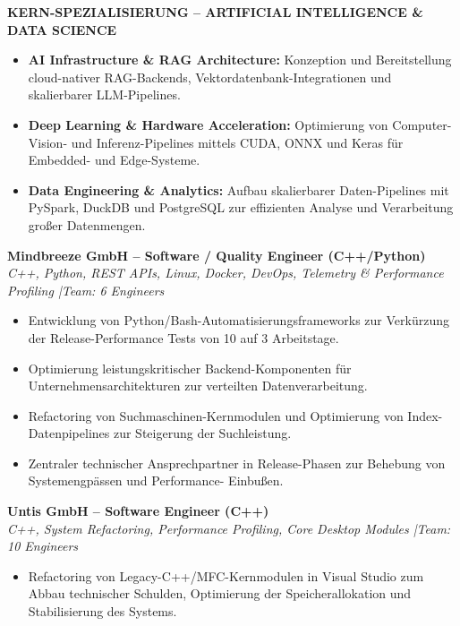 \documentclass[10pt,a4paper]{article}
\begin{document}
{\centering
\colorbox{accent!25}{%
\parbox{\dimexpr\textwidth-25\fboxsep\relax}{%
    \vspace{0.08cm}
    \centering
    {\bfseries\color{primary}KERN-SPEZIALISIERUNG -- ARTIFICIAL INTELLIGENCE \& DATA SCIENCE\par}
    \vspace{0.05cm}
    \raggedright
    \begin{itemize}[leftmargin=1.5em, itemsep=0.15em, topsep=0.15em]
        \item \textbf{\color{primary}AI Infrastructure \& RAG Architecture:} Konzeption und Bereitstellung cloud-nativer RAG-Backends, Vektordatenbank-Integrationen und skalierbarer LLM-Pipelines.
        \item \textbf{\color{primary}Deep Learning \& Hardware Acceleration:} Optimierung von Computer-Vision- und Inferenz-Pipelines mittels CUDA, ONNX und Keras für Embedded- und Edge-Systeme.
        \item \textbf{\color{primary}Data Engineering \& Analytics:} Aufbau skalierbarer Daten-Pipelines mit PySpark, DuckDB und PostgreSQL zur effizienten Analyse und Verarbeitung großer Datenmengen.
    \end{itemize}
    \vspace{0.05cm}
}%
}\par}


\textbf{Mindbreeze GmbH -- Software / Quality Engineer (C++/Python)} \\
\textit{C++, Python, REST APIs, Linux, Docker, DevOps, Telemetry \& Performance Profiling \quad|\quad Team: 6 Engineers}
\begin{itemize}
    \item Entwicklung von Python/Bash-Automatisierungsframeworks zur Verkürzung der Release-Performance Tests von 10 auf 3 Arbeitstage.
    \item Optimierung leistungskritischer Backend-Komponenten für Unternehmensarchitekturen zur verteilten Datenverarbeitung.
    \item Refactoring von Suchmaschinen-Kernmodulen und Optimierung von Index-Datenpipelines zur Steigerung der Suchleistung.
    \item Zentraler technischer Ansprechpartner in Release-Phasen zur Behebung von Systemengpässen und Performance-
Einbußen.\end{itemize}

\vspace{0.15cm}
\textbf{Untis GmbH -- Software Engineer (C++)} \\
\textit{C++, System Refactoring, Performance Profiling, Core Desktop Modules \quad|\quad Team: 10 Engineers}
\begin{itemize}
    \item Refactoring von Legacy-C++/MFC-Kernmodulen in Visual Studio zum Abbau technischer Schulden, Optimierung der Speicherallokation und Stabilisierung des Systems.
\end{itemize}
\end{document}
